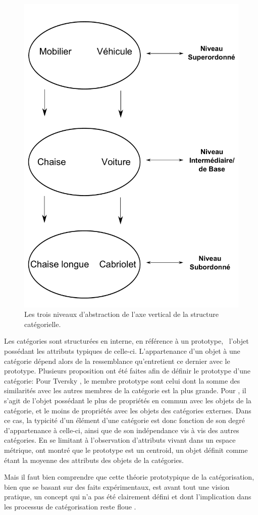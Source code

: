 \begin{figure}[bth]
        \myfloatalign
        \includegraphics[width=.6\linewidth]{gfx/categorieLVL}
        \caption{Les trois niveaux d'abstraction de l'axe vertical de la structure catégorielle.}\label{fig:categorieLVL}
\end{figure}

Les catégories sont structurées en interne, en référence à un prototype, \ie~l'objet possédant les attributs typiques de celle-ci. L'appartenance d'un objet à une catégorie dépend alors de la ressemblance qu'entretient ce dernier avec le prototype.  Plusieurs proposition ont été faites afin de définir le prototype d'une catégorie: Pour Tversky \citep{tversky1977features}, le membre prototype sont celui dont la somme des similarités avec les autres membres de la catégorie est la plus grande. Pour \citep{rosch1975family}, il s'agit de l'objet possédant le plus de propriétés en commun avec les objets de la catégorie, et le moins de propriétés avec les objets des catégories externes. Dans ce cas, la typicité d'un élément d'une catégorie est donc fonction de son degré d'appartenance à celle-ci, ainsi que de son indépendance vis à vis des autres catégories. En se limitant à l'observation d'attributs vivant dans un espace métrique, \citep{reed1972pattern, rosch1976structural} ont montré que le prototype est un centroid, un objet définit comme étant la moyenne des attributs des objets de la catégories.

Mais il faut bien comprendre que cette théorie prototypique de la catégorisation, bien que se basant sur des faits expérimentaux, est avant tout une vision pratique, un concept qui n'a pas été clairement défini et dont l'implication dans les processus de catégorisation reste floue \citep[p. 36-40]{rosch1978cognition} \citep[p. 49-54]{dubois1991semantique}.

